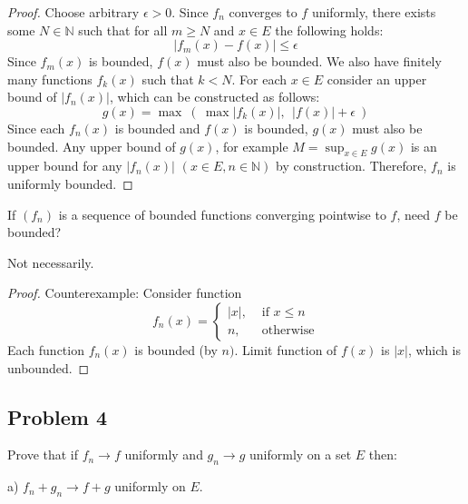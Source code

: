 \documentclass{article}
\begin{document}
\begin{proof}

Choose arbitrary $\epsilon>0$. Since $f_n$ converges to $f$  uniformly, there exists some $N \in \mathbb{N}$ such that for all $m \geq N$ and $x \in E$ the following holds:
\[ |f_m(x)-f(x)| \leq \epsilon \]
Since $f_m(x)$ is bounded, $f(x)$ must also be bounded.
We also have finitely many functions $f_k(x)$ such that $k<N$.
For each $x \in E$ consider an upper bound of $|f_n(x)|$, which can be constructed as follows:
\[ g(x) = \max \> ( \> \max |f_k(x)|, \>\> |f(x)| + \epsilon \> ) \]
Since each $f_n(x)$ is bounded and $f(x)$ is bounded, $g(x)$ must also be bounded.
Any upper bound of $g(x)$, for example $M = \sup_{x\in E} g(x)$ is an upper bound for any $|f_n(x)|$ $(x \in E, n \in \mathbb{N})$ by construction. 
Therefore, $f_n$ is uniformly bounded.

\end{proof}

\begin{tcolorbox}
If $(f_n)$ is a sequence of bounded functions converging pointwise to $f$, need $f$ be bounded?
\end{tcolorbox}

Not necessarily.

\begin{proof}

Counterexample: Consider function
\[
    f_n(x) =
    \begin{cases}
        |x|, & \text{ if $x \leq n$} \\
        n, & \text{ otherwise}
    \end{cases}
\]
Each function $f_n(x)$ is bounded (by $n)$.
Limit function of $f(x)$ is $|x|$, which is unbounded.

\end{proof}


\subsection*{Problem 4}

\begin{tcolorbox}
Prove that if $f_n \to f$ uniformly and $g_n \to g$ uniformly on a set $E$ then:

a) $f_n + g_n \to f + g$ uniformly on $E$.
\end{tcolorbox}
\end{document}
